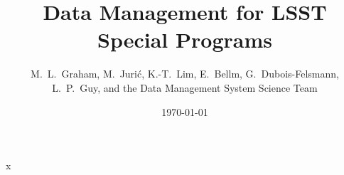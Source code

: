 \documentclass[DM,lsstdoc,toc]{lsstdoc}
\title[LSST Special Programs]{Data Management for LSST Special Programs}
\author{M.~L.~Graham, M.~Juri\'{c}, K.-T.~Lim, E.~Bellm, G.~Dubois-Felsmann, L.~P.~Guy, and the Data Management System Science Team}
\date{\today}
\begin{document}
\maketitle



x






\clearpage


\clearpage
\appendix








\end{document}
